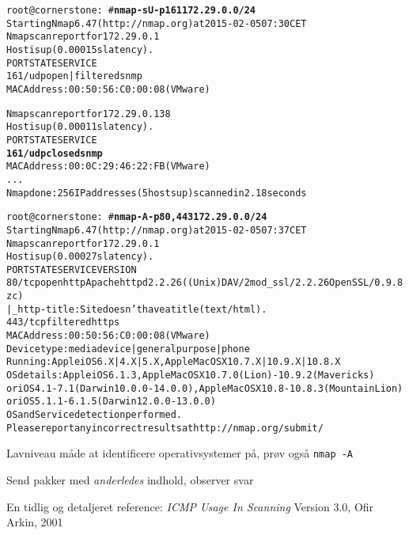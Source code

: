 \documentclass[Screen16to9,17pt]{foils}
\begin{document}

\begin{alltt}\small
root@cornerstone:~#{\bfseries nmap -sU -p 161 172.29.0.0/24}
Starting Nmap 6.47 ( http://nmap.org ) at 2015-02-05 07:30 CET
Nmap scan report for 172.29.0.1
Host is up (0.00015s latency).
PORT    STATE         SERVICE
{\color{darkgreen}161/udp open|filtered snmp}
MAC Address: 00:50:56:C0:00:08 (VMware)

Nmap scan report for 172.29.0.138
Host is up (0.00011s latency).
PORT    STATE  SERVICE
{\bf{161/udp closed snmp}}
MAC Address: 00:0C:29:46:22:FB (VMware)
...
Nmap done: 256 IP addresses (5 hosts up) scanned in 2.18 seconds
\end{alltt}

\begin{alltt}\footnotesize
root@cornerstone:~#{\bfseries nmap -A -p80,443 172.29.0.0/24}
Starting Nmap 6.47 ( http://nmap.org ) at 2015-02-05 07:37 CET
Nmap scan report for 172.29.0.1
Host is up (0.00027s latency).
PORT    STATE    SERVICE VERSION
80/tcp  open     http    Apache httpd 2.2.26 ((Unix) DAV/2 mod_ssl/2.2.26 OpenSSL/0.9.8zc)
|_http-title: Site doesn't have a title (text/html).
443/tcp filtered https
MAC Address: 00:50:56:C0:00:08 (VMware)
Device type: media device|general purpose|phone
Running: Apple iOS 6.X|4.X|5.X, Apple Mac OS X 10.7.X|10.9.X|10.8.X
OS details: Apple iOS 6.1.3, Apple Mac OS X 10.7.0 (Lion) - 10.9.2 (Mavericks)
or iOS 4.1 - 7.1 (Darwin 10.0.0 - 14.0.0), Apple Mac OS X 10.8 - 10.8.3 (Mountain Lion)
or iOS 5.1.1 - 6.1.5 (Darwin 12.0.0 - 13.0.0)
OS and Service detection performed.
Please report any incorrect results at http://nmap.org/submit/
\end{alltt}

\begin{list2}
\item Lavniveau måde at identificere operativsystemer på, prøv også
  \verb+nmap -A+
\item Send pakker med \emph{anderledes} indhold, observer svar
\item En tidlig og detaljeret reference: \emph{ICMP Usage In Scanning} Version 3.0,
  Ofir Arkin, 2001 %
\end{list2}



\end{document}
